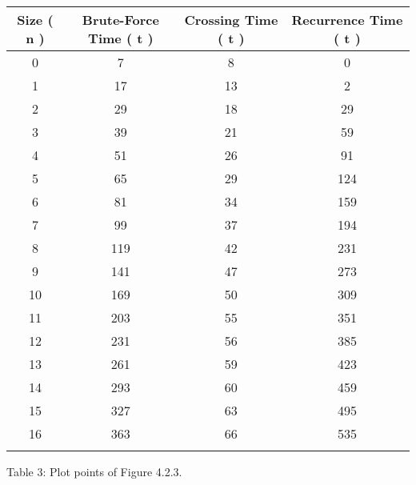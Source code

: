 \begin{center} 
\begin{tabular}[.5cm]{ c c c c } 
\toprule 
\hspace{10pt} Size ( n ) \hspace{10pt} & \hspace{10pt} Brute-Force Time ( t ) \hspace{10pt} & \hspace{10pt} Crossing Time ( t ) \hspace{10pt} & \hspace{10pt} Recurrence Time ( t ) \\ 
\midrule 
0 & 7 & 8 & 0 \\ 
\cmidrule {1-4} 
1 & 17 & 13 & 2 \\ 
\cmidrule {1-4} 
2 & 29 & 18 & 29 \\ 
\cmidrule {1-4} 
3 & 39 & 21 & 59 \\ 
\cmidrule {1-4} 
4 & 51 & 26 & 91 \\ 
\cmidrule {1-4} 
5 & 65 & 29 & 124 \\ 
\cmidrule {1-4} 
6 & 81 & 34 & 159 \\ 
\cmidrule {1-4} 
7 & 99 & 37 & 194 \\ 
\cmidrule {1-4} 
8 & 119 & 42 & 231 \\ 
\cmidrule {1-4} 
9 & 141 & 47 & 273 \\ 
\cmidrule {1-4} 
10 & 169 & 50 & 309 \\ 
\cmidrule {1-4} 
11 & 203 & 55 & 351 \\ 
\cmidrule {1-4} 
12 & 231 & 56 & 385 \\ 
\cmidrule {1-4} 
13 & 261 & 59 & 423 \\ 
\cmidrule {1-4} 
14 & 293 & 60 & 459 \\ 
\cmidrule {1-4} 
15 & 327 & 63 & 495 \\ 
\cmidrule {1-4} 
16 & 363 & 66 & 535 \\ 
\bottomrule 
\linebreak 
\end{tabular} 
\linebreak \linebreak Table 3: Plot points of Figure 4.2.3.
\end{center} \hfill 

\pagebreak